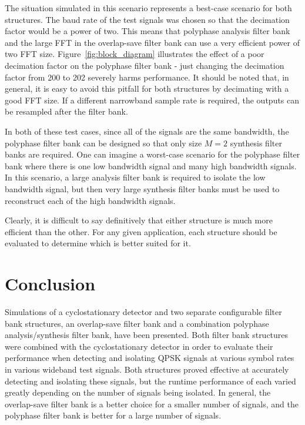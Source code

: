 \documentclass[12pt]{article}
\begin{document}
The situation simulated in this scenario represents a best-case scenario for
both structures. The baud rate of the test signals was chosen so that the
decimation factor would be a power of two. This means that polyphase analysis
filter bank and the large FFT in the overlap-save filter bank can use a very
efficient power of two FFT size. Figure~\ref{fig:block_diagram} illustrates the
effect of a poor decimation factor on the polyphase filter bank - just changing
the decimation factor from 200 to 202 severely harms performance. It should be
noted that, in general, it is easy to avoid this pitfall for both structures by
decimating with a good FFT size. If a different narrowband sample rate is
required, the outputs can be resampled after the filter bank.

In both of these test cases, since all of the signals are the same bandwidth,
the polyphase filter bank can be designed so that only size $M=2$ synthesis
filter banks are required.  One can imagine a worst-case scenario for the
polyphase filter bank where there is one low bandwidth signal and many high
bandwidth signals.  In this scenario, a large analysis filter bank is required
to isolate the low bandwidth signal, but then very large synthesis filter banks
must be used to reconstruct each of the high bandwidth signals.

Clearly, it is difficult to say definitively that either structure is much more
efficient than the other. For any given application, each structure should be
evaluated to determine which is better suited for it.


\section{Conclusion}
\label{sec:conclusion}
Simulations of a cyclostationary detector and two separate configurable filter
bank structures, an overlap-save filter bank and a combination polyphase
analysis/synthesis filter bank, have been presented. Both filter bank
structures were combined with the cyclostationary detector in order to evaluate
their performance when detecting and isolating QPSK signals at various symbol
rates in various wideband test signals. Both structures proved effective at accurately
detecting and isolating these signals, but the runtime performance of each
varied greatly depending on the number of signals being isolated. In general,
the overlap-save filter bank is a better choice for a smaller number of signals,
and the polyphase filter bank is better for a large number of signals.
\end{document}
